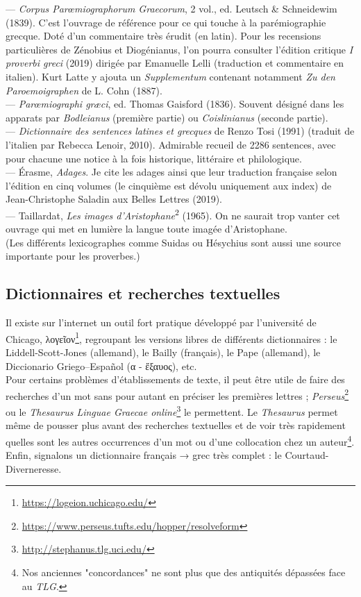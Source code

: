 \documentclass{book}%
\newcommand{\italique}[1]{\textit{#1}}%
\newcommand{\expo}[1]{\textsuperscript{#1}}%
\newcommand{\sousPartie}[1]{\subsection*{#1}}%
\newcommand{\note}[1]{\footnote{#1}}
\begin{document}
--- \italique{Corpus Parœmiographorum Graecorum}, 2 vol., ed. Leutsch \& Schneidewim (1839). C'est l'ouvrage de référence pour ce qui touche à la parémiographie grecque. Doté d'un commentaire très érudit (en latin). Pour les recensions particulières de Zénobius et Diogénianus, l'on pourra consulter l'édition critique \italique{I proverbi greci} (2019) dirigée par Emanuelle Lelli (traduction et commentaire en italien). Kurt Latte y ajouta un \italique{Supplementum} contenant notamment \italique{Zu den Paroemoigraphen} de L. Cohn (1887).\\

--- \italique{Parœmiographi græci}, ed. Thomas Gaisford (1836). Souvent désigné dans les apparats par \italique{Bodleianus} (première partie) ou \italique{Coislinianus} (seconde partie). \\


--- \italique{Dictionnaire des sentences latines et grecques} de Renzo Tosi (1991) (traduit de l'italien par Rebecca Lenoir, 2010). Admirable recueil de 2286 sentences, avec pour chacune une notice à la fois historique, littéraire et philologique.\\

--- Érasme, \italique{Adages}. Je cite les adages ainsi que leur traduction française selon l'édition en cinq volumes (le cinquième est dévolu uniquement aux index) de Jean-Christophe Saladin aux Belles Lettres (2019).\\


--- Taillardat, \italique{Les images d'Aristophane}\expo{2} (1965). On ne saurait trop vanter cet ouvrage qui met en lumière la langue toute imagée d'Aristophane.\\

(Les différents lexicographes comme Suidas ou Hésychius sont aussi une source importante pour les proverbes.)


\sousPartie{Dictionnaires et recherches textuelles}

Il existe sur l'internet un outil fort pratique développé par l'université de Chicago, λογεῖον\note{\href{https://logeion.uchicago.edu/}{https://logeion.uchicago.edu/}}, regroupant les versions libres de différents dictionnaires : le Liddell-Scott-Jones (allemand), le Bailly (français), le Pape (allemand), le Diccionario Griego–Español (α - ἔξαυος), etc.\\

Pour certains problèmes d'établissements de texte, il peut être utile de faire des recherches d'un mot sans pour autant en préciser les premières lettres ; \italique{Perseus}\note{\href{https://www.perseus.tufts.edu/hopper/resolveform}{https://www.perseus.tufts.edu/hopper/resolveform}} ou le \italique{Thesaurus Linguae Graecae online}\note{\href{http://stephanus.tlg.uci.edu/}{http://stephanus.tlg.uci.edu/}} le permettent. Le \italique{Thesaurus} permet même de pousser plus avant des recherches textuelles et de voir très rapidement quelles sont les autres occurrences d'un mot ou d'une collocation chez un auteur\note{Nos anciennes "concordances" ne sont plus que des antiquités dépassées face au \italique{TLG}.}.\\
Enfin, signalons un dictionnaire français → grec très complet : le Courtaud-Diverneresse. 
\end{document}
